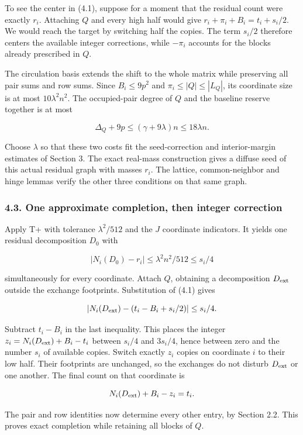\documentclass[english,11pt,a4paper]{article}
\begin{document}
To see the center in (4.1), suppose for a moment that the residual count were exactly \(r_i\). Attaching \(Q\) and every high half would give \(r_i+\pi_i+B_i=t_i+s_i/2\). We would reach the target by switching half the copies. The term \(s_i/2\) therefore centers the available integer corrections, while \(-\pi_i\) accounts for the blocks already prescribed in \(Q\).

The circulation basis extends the shift to the whole matrix while preserving all pair sums and row sums. Since \(B_i\le9p^2\) and \(\pi_i\le|Q|\le|L_Q|\), its coordinate size is at most \(10\lambda^2n^2\). The occupied-pair degree of \(Q\) and the baseline reserve together is at most

\[\Delta_Q+9p\le(\gamma+9\lambda)n\le18\lambda n.\]

Choose \(\lambda\) so that these two costs fit the seed-correction and interior-margin estimates of Section 3. The exact real-mass construction gives a diffuse seed of this actual residual graph with masses \(r_i\). The lattice, common-neighbor and hinge lemmas verify the other three conditions on that same graph.

\subsubsection{4.3. One approximate completion, then integer correction}\label{one-approximate-completion-then-integer-correction}

Apply T+ with tolerance \(\lambda^2/512\) and the \(J\) coordinate indicators. It yields one residual decomposition \(D_0\) with

\[|N_i(D_0)-r_i|\le\lambda^2n^2/512\le s_i/4\]

simultaneously for every coordinate. Attach \(Q\), obtaining a decomposition \(D_{\rm ext}\) outside the exchange footprints. Substitution of (4.1) gives

\[\left|N_i(D_{\rm ext})-(t_i-B_i+s_i/2)\right|\le s_i/4.\]

Subtract \(t_i-B_i\) in the last inequality. This places the integer \(z_i=N_i(D_{\rm ext})+B_i-t_i\) between \(s_i/4\) and \(3s_i/4\), hence between zero and the number \(s_i\) of available copies. Switch exactly \(z_i\) copies on coordinate \(i\) to their low half. Their footprints are unchanged, so the exchanges do not disturb \(D_{\rm ext}\) or one another. The final count on that coordinate is

\[N_i(D_{\rm ext})+B_i-z_i=t_i.\]

The pair and row identities now determine every other entry, by Section 2.2. This proves exact completion while retaining all blocks of \(Q\).
\end{document}
